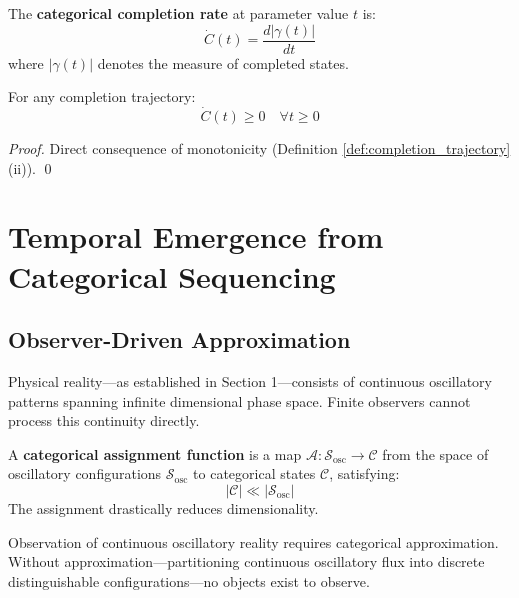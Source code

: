 \begin{definition}
\label{def:completion_rate}
The \textbf{categorical completion rate} at parameter value $t$ is:
\begin{equation}
\dot{C}(t) = \frac{d|\gamma(t)|}{dt}
\end{equation}
where $|\gamma(t)|$ denotes the measure of completed states.
\end{definition}

\begin{proposition}
\label{prop:nonnegative_rate}
For any completion trajectory:
\begin{equation}
\dot{C}(t) \geq 0 \quad \forall t \geq 0
\end{equation}
\end{proposition}

\begin{proof}
Direct consequence of monotonicity (Definition \ref{def:completion_trajectory}(ii)). \qed
\end{proof}

\section{Temporal Emergence from Categorical Sequencing}

\subsection{Observer-Driven Approximation}

Physical reality—as established in Section 1—consists of continuous oscillatory patterns spanning infinite dimensional phase space. Finite observers cannot process this continuity directly.

\begin{definition}
\label{def:categorical_assignment}
A \textbf{categorical assignment function} is a map $\mathcal{A}: \mathcal{S}_{\text{osc}} \to \mathcal{C}$ from the space of oscillatory configurations $\mathcal{S}_{\text{osc}}$ to categorical states $\mathcal{C}$, satisfying:
\begin{equation}
|\mathcal{C}| \ll |\mathcal{S}_{\text{osc}}|
\end{equation}
The assignment drastically reduces dimensionality.
\end{definition}

\begin{theorem}
\label{thm:approximation_necessity}
Observation of continuous oscillatory reality requires categorical approximation. Without approximation—partitioning continuous oscillatory flux into discrete distinguishable configurations—no objects exist to observe.
\end{theorem}

